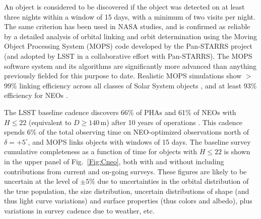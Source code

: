 An object is considered to be discovered if the object was detected on at least three nights within a
window of 15 days, with a minimum of two visits per night. The same criterion has been used in NASA studies,
and is confirmed as reliable by a detailed analysis of orbital linking and orbit determination using the Moving
Object Processing System (MOPS) code \citep{2017AJ....154...12V,2017AJ....154...13V,2005AAS...20712102J} developed by the
Pan-STARRS project (and adopted by LSST in a collaborative effort with Pan-STARRS). The MOPS software
system and its algorithms are significantly more advanced than anything previously
fielded for this purpose to date. Realistic MOPS simulations show
$>$99\% linking efficiency across all classes of Solar System objects \citep{2013PASP..125..357D},
and at least 93\% efficiency for NEOs \citep{2017AJ....154...12V,2017AJ....154...13V}.

The LSST baseline cadence discovers 66\% of PHAs and 61\% of NEOs with $H\leq22$ (equivalent to $D\ge140$\,m)
after 10 years of operations \citep{2017arXiv171110621J}.  This cadence spends 6\% of the total
observing time on NEO-optimized observations north of $\delta = +5^\circ$, and MOPS links objects with windows of 15 days.
The baseline survey cumulative completeness as a function of time for objects with $H\le22$ is shown in the upper panel of Fig.~\ref{Fig:Cneo},
both with and without including contributions from current and
on-going surveys. These figures are likely to be uncertain at the level of $\pm5\%$ due
to uncertainties in the orbital distribution of the true population, the size distribution, uncertain distributions of shape
(and thus light curve variations) and surface properties (thus colors and albedo), plus variations in survey cadence due to
weather, etc.


